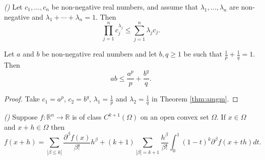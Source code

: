 \documentclass[oneside,hidelinks,indentfirst,10pt]{book}
\begin{document}
\begin{thm}\emph{(\cite{Motzkin})}\label{thm:amgm}
Let \(c_1,\dots,c_n\) be non-negative real numbers, and assume that \(\lambda_1,\dots,\lambda_n\) are non-negative and \(\lambda_1+\cdots+\lambda_n=1\). Then
\[
    \prod_{j=1}^nc_j^{\lambda_j}\leq \sum_{j=1}^n\lambda_j c_j.
\]
\end{thm}

\begin{cor}\label{cor:young}
Let \(a\) and \(b\) be non-negative real numbers and let \(b,q\geq 1\) be such that \(\frac{1}{p}+\frac{1}{q}=1\). Then
\[
    ab\leq \frac{a^p}{p}+\frac{b^q}{q}.
\]
\end{cor}

\begin{proof}
Take \(c_1=a^p\), \(c_2=b^q\), \(\lambda_1=\frac{1}{p}\) and \(\lambda_2=\frac{1}{q}\) in Theorem \ref{thm:amgm}.
\end{proof}


\begin{thm}\emph{(\cite[Theorem 2.68]{folland})}\label{thm:taylorthm}
Suppose \(f:\mathbb{R}^n\rightarrow\mathbb{R}\) is of class \(C^{k+1}(\Omega)\) on an open convex set \(\Omega\). If \(x\in\Omega\) and \(x+h\in\Omega\) then
\[
    f(x+h)=\sum_{|\beta\leq k|}\frac{\partial^\beta f(x)}{\beta!}h^\beta+(k+1)\sum_{|\beta|=k+1}\frac{h^\beta}{\beta!}\int_0^1(1-t)^k\partial^\beta f(x+th)dt.
\]
\end{thm}
\end{document}
